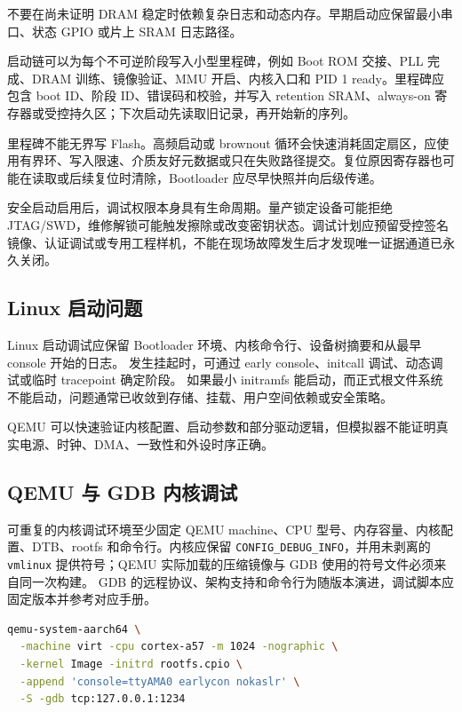不要在尚未证明 DRAM 稳定时依赖复杂日志和动态内存。早期启动应保留最小串口、状态 GPIO 或片上 SRAM 日志路径。

启动链可以为每个不可逆阶段写入小型里程碑，例如 Boot ROM 交接、PLL 完成、DRAM 训练、镜像验证、MMU 开启、内核入口和 PID 1 ready。里程碑应包含 boot ID、阶段 ID、错误码和校验，并写入 retention SRAM、always-on 寄存器或受控持久区；下次启动先读取旧记录，再开始新的序列。

里程碑不能无界写 Flash。高频启动或 brownout 循环会快速消耗固定扇区，应使用有界环、写入限速、介质友好元数据或只在失败路径提交。复位原因寄存器也可能在读取或后续复位时清除，Bootloader 应尽早快照并向后级传递。

安全启动启用后，调试权限本身具有生命周期。量产锁定设备可能拒绝 JTAG/SWD，维修解锁可能触发擦除或改变密钥状态。调试计划应预留受控签名镜像、认证调试或专用工程样机，不能在现场故障发生后才发现唯一证据通道已永久关闭。

\subsection{Linux 启动问题}

Linux 启动调试应保留 Bootloader 环境、内核命令行、设备树摘要和从最早 console 开始的日志。
发生挂起时，可通过 early console、initcall 调试、动态调试或临时 tracepoint 确定阶段。
如果最小 initramfs 能启动，而正式根文件系统不能启动，问题通常已收敛到存储、挂载、用户空间依赖或安全策略。

QEMU 可以快速验证内核配置、启动参数和部分驱动逻辑，但模拟器不能证明真实电源、时钟、DMA、一致性和外设时序正确\cite{qemu-system-doc}。

\subsection{QEMU 与 GDB 内核调试}

可重复的内核调试环境至少固定 QEMU machine、CPU 型号、内存容量、内核配置、DTB、rootfs 和命令行。内核应保留 \texttt{CONFIG\_DEBUG\_INFO}，并用未剥离的 \texttt{vmlinux} 提供符号；QEMU 实际加载的压缩镜像与 GDB 使用的符号文件必须来自同一次构建。
GDB 的远程协议、架构支持和命令行为随版本演进，调试脚本应固定版本并参考对应手册\cite{gdb-manual}。

\begin{lstlisting}[language=bash,caption={QEMU 停机等待 GDB 的启动方式（AArch64 示例）}]
qemu-system-aarch64 \
  -machine virt -cpu cortex-a57 -m 1024 -nographic \
  -kernel Image -initrd rootfs.cpio \
  -append 'console=ttyAMA0 earlycon nokaslr' \
  -S -gdb tcp:127.0.0.1:1234
\end{lstlisting}

